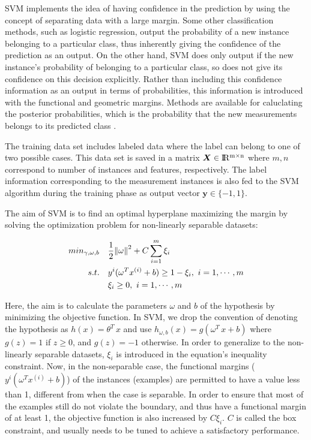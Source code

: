 SVM implements the idea of having confidence in the prediction by using the concept of separating data with a large margin. 
Some other classification methods, such as logistic regression, output the probability of a new instance belonging to a particular class, thus inherently giving the confidence of the prediction as an output. 
On the other hand, SVM does only output if the new instance's probability of belonging to a particular class, so does not give its confidence on this decision explicitly. %
Rather than including this confidence information as an output in terms of probabilities, this information is introduced with the functional and geometric margins. 
Methods are available for caluclating the posterior probabilities, which is the probability that the new measurements belongs to its predicted class \cite{platt1999probabilistic}. 

The training data set includes labeled data where the label can belong to one of two possible cases. This data set is saved in a matrix $\bm{X} \in {\rm I\!R^{m \times n}}  $ where $m,n$ correspond to number of instances and features, respectively. The label information corresponding to the measurement instances is also fed to the SVM algorithm during the training phase as output vector $\bm{y} \in \{-1,1\}$. 

The aim of SVM is to find an optimal hyperplane maximizing the margin by solving the optimization problem for non-linearly separable datasets:

\begin{align}
min_{\gamma,\omega,b} \quad & \frac{1}{2} \norm{\omega}^2 + C \sum\limits_{i = 1}^m \xi_i \\
s.t. \quad & y^{i}(\omega^T x^{(i)} + b) \geq 1 - \xi_i, \ i = 1, \cdots, m\\
 & \xi_i \geq 0, \ i = 1, \cdots, m
\end{align}

Here, the aim is to calculate the parameters $\omega$ and $b$ of the hypothesis by minimizing the objective function. In SVM, we drop the convention of denoting the hypothesis as $h(x)= \theta^T \, x$ and use $h_{\omega,b}(x)=g(\omega^T \, x + b)$ where $g(z) = 1$ if $z\geq0$, and $g(z)=-1$ otherwise. In order to generalize to the non-linearly separable datasets, $\xi_i$ is introduced in the equation's inequality constraint. Now, in the non-separable case, the functional margins ($y^{i}(\omega^T x^{(i)} + b)$) of the instances (examples) are permitted to have a value less than 1, different from when the case is separable. In order to ensure that most of the examples still do not violate the boundary, and thus have a functional margin of at least 1, the objective function is also increased by $C \xi_i$. $C$ is called the box constraint, and usually needs to be tuned to achieve a satisfactory performance.

